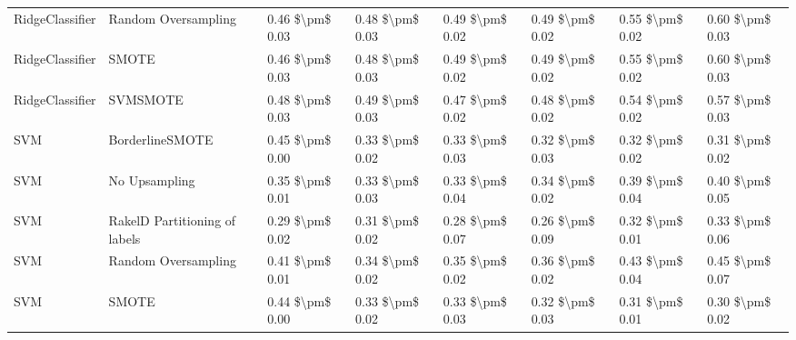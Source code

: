 \begin{tabular}{llllllll}
                RidgeClassifier &           Random Oversampling & 0.46 \$\textbackslash pm\$ 0.03 &           0.48 \$\textbackslash pm\$ 0.03 &       0.49 \$\textbackslash pm\$ 0.02 &        0.49 \$\textbackslash pm\$ 0.02 &                         0.55 \$\textbackslash pm\$ 0.02 &     0.60 \$\textbackslash pm\$ 0.03 \\
                RidgeClassifier &                         SMOTE & 0.46 \$\textbackslash pm\$ 0.03 &           0.48 \$\textbackslash pm\$ 0.03 &       0.49 \$\textbackslash pm\$ 0.02 &        0.49 \$\textbackslash pm\$ 0.02 &                         0.55 \$\textbackslash pm\$ 0.02 &     0.60 \$\textbackslash pm\$ 0.03 \\
                RidgeClassifier &                      SVMSMOTE & 0.48 \$\textbackslash pm\$ 0.03 &           0.49 \$\textbackslash pm\$ 0.03 &       0.47 \$\textbackslash pm\$ 0.02 &        0.48 \$\textbackslash pm\$ 0.02 &                         0.54 \$\textbackslash pm\$ 0.02 &     0.57 \$\textbackslash pm\$ 0.03 \\
                            SVM &               BorderlineSMOTE & 0.45 \$\textbackslash pm\$ 0.00 &           0.33 \$\textbackslash pm\$ 0.02 &       0.33 \$\textbackslash pm\$ 0.03 &        0.32 \$\textbackslash pm\$ 0.03 &                         0.32 \$\textbackslash pm\$ 0.02 &     0.31 \$\textbackslash pm\$ 0.02 \\
                            SVM &                 No Upsampling & 0.35 \$\textbackslash pm\$ 0.01 &           0.33 \$\textbackslash pm\$ 0.03 &       0.33 \$\textbackslash pm\$ 0.04 &        0.34 \$\textbackslash pm\$ 0.02 &                         0.39 \$\textbackslash pm\$ 0.04 &     0.40 \$\textbackslash pm\$ 0.05 \\
                            SVM & RakelD Partitioning of labels & 0.29 \$\textbackslash pm\$ 0.02 &           0.31 \$\textbackslash pm\$ 0.02 &       0.28 \$\textbackslash pm\$ 0.07 &        0.26 \$\textbackslash pm\$ 0.09 &                         0.32 \$\textbackslash pm\$ 0.01 &     0.33 \$\textbackslash pm\$ 0.06 \\
                            SVM &           Random Oversampling & 0.41 \$\textbackslash pm\$ 0.01 &           0.34 \$\textbackslash pm\$ 0.02 &       0.35 \$\textbackslash pm\$ 0.02 &        0.36 \$\textbackslash pm\$ 0.02 &                         0.43 \$\textbackslash pm\$ 0.04 &     0.45 \$\textbackslash pm\$ 0.07 \\
                            SVM &                         SMOTE & 0.44 \$\textbackslash pm\$ 0.00 &           0.33 \$\textbackslash pm\$ 0.02 &       0.33 \$\textbackslash pm\$ 0.03 &        0.32 \$\textbackslash pm\$ 0.03 &                         0.31 \$\textbackslash pm\$ 0.01 &     0.30 \$\textbackslash pm\$ 0.02 \\

\end{tabular}
